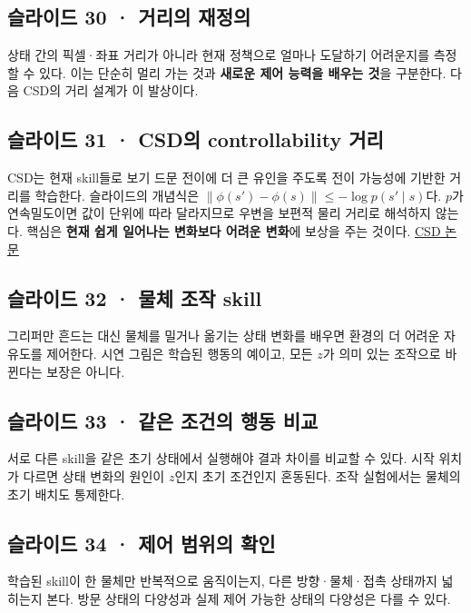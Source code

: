 \documentclass[11pt,a4paper]{article}
\begin{document}
\subsection{슬라이드 30 · 거리의 재정의}

상태 간의 픽셀·좌표 거리가 아니라 현재 정책으로 얼마나 도달하기 어려운지를 측정할 수 있다. 이는 단순히 멀리 가는 것과 \textbf{새로운 제어 능력을 배우는 것}을 구분한다. 다음 CSD의 거리 설계가 이 발상이다.\par

\subsection{슬라이드 31 · CSD의 controllability 거리}

CSD는 현재 skill들로 보기 드문 전이에 더 큰 유인을 주도록 전이 가능성에 기반한 거리를 학습한다. 슬라이드의 개념식은 $\|\phi(s')-\phi(s)\|\le -\log p(s'\mid s)$다. $p$가 연속밀도이면 값이 단위에 따라 달라지므로 우변을 보편적 물리 거리로 해석하지 않는다. 핵심은 \textbf{현재 쉽게 일어나는 변화보다 어려운 변화}에 보상을 주는 것이다. \href{https://arxiv.org/abs/2302.05103}{CSD 논문}\par

\subsection{슬라이드 32 · 물체 조작 skill}

그리퍼만 흔드는 대신 물체를 밀거나 옮기는 상태 변화를 배우면 환경의 더 어려운 자유도를 제어한다. 시연 그림은 학습된 행동의 예이고, 모든 $z$가 의미 있는 조작으로 바뀐다는 보장은 아니다.\par

\subsection{슬라이드 33 · 같은 조건의 행동 비교}

서로 다른 skill을 같은 초기 상태에서 실행해야 결과 차이를 비교할 수 있다. 시작 위치가 다르면 상태 변화의 원인이 $z$인지 초기 조건인지 혼동된다. 조작 실험에서는 물체의 초기 배치도 통제한다.\par

\subsection{슬라이드 34 · 제어 범위의 확인}

학습된 skill이 한 물체만 반복적으로 움직이는지, 다른 방향·물체·접촉 상태까지 넓히는지 본다. 방문 상태의 다양성과 실제 제어 가능한 상태의 다양성은 다를 수 있다.\par
\end{document}
